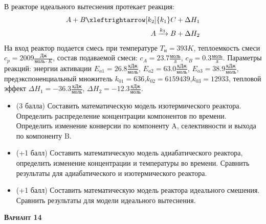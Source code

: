  В реакторе идеального вытеснения протекает реакция: \begin{equation*} \begin{aligned} A+B \xleftrightarrow[k_2]{k_1} C +\Delta H_1 \\ A \xrightarrow{k_3} B + \Delta H_2 \end{aligned} \end{equation*}                                     На вход  реактор подается смесь при температуре $ T_н =  393 K$, теплоемкость смеси $c_p= 2009 \frac{Дж}{моль \cdot K}$, состав подаваемой смеси: $c_A=23.7 \frac{моль}{л}$, $c_B=0.3 \frac{моль}{л}$. Параметры реакций: энергии активации $E_{a1}=26.8 \frac{кДж}{моль}$, $E_{a2}=63.0  \frac{кДж}{моль}$, $E_{a3}=38.9  \frac{кДж}{моль}$, предэкспоненциальный множитель $k_{01}=       636$,$k_{02}=   6159439$,$k_{03}=     12933$, тепловой эффект $\Delta H_1= -36.3  \frac{кДж}{моль}$, $\Delta H_2=-12.3 \frac{кДж}{моль}$.\begin{itemize} \item (3 балла) Составить математическую модель изотермического реактора. Определить распределение концентрации компонентов по времени. Определить изменение конверсии по компоненту A, селективности и выхода по компоненту B. \item (+1 балл) Составить математическую модель адиабатического реактора, определить изменение концентрации и температуры во времени. Сравнить результаты для адиабатического и изотермического реактора. \item (+1 балл) Составить математическую модель реактора идеального смешения. Сравнить результаты для модели идеального вытеснения. \end{itemize}

\textsc{\textbf{Вариант 14}}

